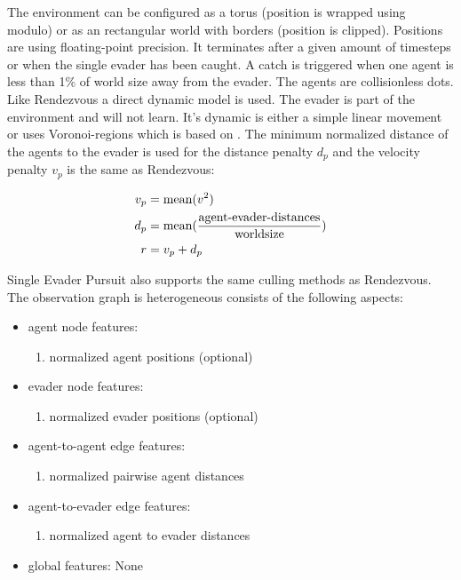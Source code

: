 The environment can be configured as a torus (position is wrapped using modulo) or as an rectangular world with borders (position is clipped). Positions are using floating-point precision. It terminates after a given amount of timesteps or when the single evader has been caught. A catch is triggered when one agent is less than 1\% of world size away from the evader.
The agents are collisionless dots. Like Rendezvous a direct dynamic model is used. The evader is part of the environment and will not learn. It's dynamic is either a simple linear movement or uses Voronoi-regions which is based on \citet{ZHOU201664}.
The minimum normalized distance of the agents to the evader is used for the distance penalty $d_p$ and the velocity penalty $v_p$ is the same as Rendezvous:

\begin{equation}
    \begin{aligned}
        v_p &= \textup{mean}(v^2)\\
        d_p &= \textup{mean}(\frac{\textup{agent-evader-distances}}{\textup{worldsize}}) \\
        r &= v_p + d_p
    \end{aligned}
    \nonumber
\end{equation}

Single Evader Pursuit also supports the same culling methods as Rendezvous. The observation graph is heterogeneous consists of the following aspects:
\begin{itemize}[noitemsep,nolistsep]
    \item agent node features:
    \begin{enumerate}
        \item normalized agent positions (optional)
    \end{enumerate} 
    \item evader node features:
    \begin{enumerate}
        \item normalized evader positions (optional)
    \end{enumerate}
    \item agent-to-agent edge features:
    \begin{enumerate}
        \item normalized pairwise agent distances
    \end{enumerate} 
    \item agent-to-evader edge features:
    \begin{enumerate}
        \item normalized agent to evader distances
    \end{enumerate} 
    \item global features: None
\end{itemize}



